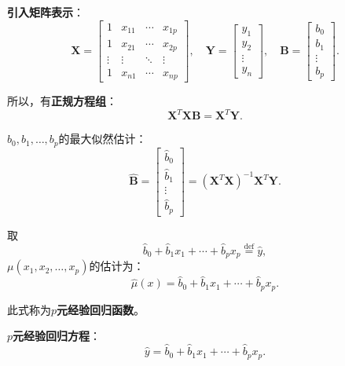 \documentclass[11pt,a4paper]{report}
\theoremstyle{definition}
\begin{document}
\textbf{引入矩阵表示}：
\[
\boldsymbol{X}=\begin{bmatrix}
1 & x_{11} & \cdots & x_{1p}\\
1 & x_{21} & \cdots & x_{2p}\\
\vdots & \vdots & \ddots & \vdots\\
1 & x_{n1} & \cdots & x_{np}
\end{bmatrix},\quad
\boldsymbol{Y}=\begin{bmatrix}
y_{1}\\ y_{2}\\ \vdots\\ y_{n}
\end{bmatrix},\quad
\boldsymbol{B}=\begin{bmatrix}
b_{0}\\ b_{1}\\ \vdots\\ b_{p}
\end{bmatrix}.
\]

所以，有\textbf{正规方程组}：
\[
\boldsymbol{X}^{T}\boldsymbol{X}\boldsymbol{B}=\boldsymbol{X}^{T}\boldsymbol{Y}.
\]

$b_{0},b_{1},\ldots,b_{p}$的最大似然估计：
\[
\widehat{\boldsymbol{B}}=\begin{bmatrix}
\hat{b}_{0}\\ \hat{b}_{1}\\ \vdots\\ \hat{b}_{p}
\end{bmatrix}
=(\boldsymbol{X}^{T}\boldsymbol{X})^{-1}\boldsymbol{X}^{T}\boldsymbol{Y}.
\]

取
\[
\hat{b}_{0}+\hat{b}_{1}x_{1}+\cdots+\hat{b}_{p}x_{p}\stackrel{\text{def}}{=}\hat{y},
\]
$\mu(x_{1},x_{2},\ldots,x_{p})$的估计为：
\[
\hat{\mu}(x)=\hat{b}_{0}+\hat{b}_{1}x_{1}+\cdots+\hat{b}_{p}x_{p}.
\]

此式称为\textbf{$p$元经验回归函数}。

\textbf{$p$元经验回归方程}：
\[
\hat{y}=\hat{b}_{0}+\hat{b}_{1}x_{1}+\cdots+\hat{b}_{p}x_{p}.
\]
\end{document}
